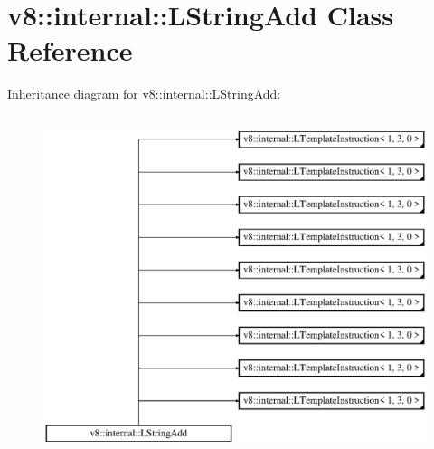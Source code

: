 \hypertarget{classv8_1_1internal_1_1_l_string_add}{}\section{v8\+:\+:internal\+:\+:L\+String\+Add Class Reference}
\label{classv8_1_1internal_1_1_l_string_add}
Inheritance diagram for v8\+:\+:internal\+:\+:L\+String\+Add\+:\begin{figure}[H]
\begin{center}
\leavevmode
\includegraphics[height=10.000000cm]{classv8_1_1internal_1_1_l_string_add}
\end{center}
\end{figure}
